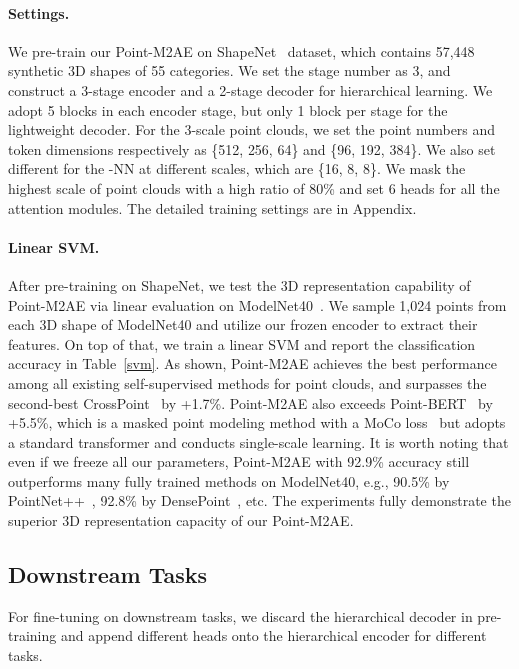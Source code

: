 \documentclass{article}
\begin{document}
\paragraph{Settings.}
We pre-train our Point-M2AE on ShapeNet~\cite{chang2015shapenet} dataset, which contains 57,448 synthetic 3D shapes of 55 categories. 
We set the stage number  as 3, and construct a 3-stage encoder and a 2-stage decoder for hierarchical learning. We adopt 5 blocks in each encoder stage, but only 1 block per stage for the lightweight decoder. For the 3-scale point clouds, we set the point numbers and token dimensions respectively as \{512, 256, 64\} and \{96, 192, 384\}. We also set different  for the -NN at different scales, which are \{16, 8, 8\}. We mask the highest scale of point clouds with a high ratio of 80\% and set 6 heads for all the attention modules. The detailed training settings are in Appendix.


\vspace{-0.1cm}
\paragraph{Linear SVM.}
After pre-training on ShapeNet, we test the 3D representation capability of Point-M2AE via linear evaluation on ModelNet40~\cite{modelnet40}. We sample 1,024 points from each 3D shape of ModelNet40 and utilize our frozen encoder to extract their features. On top of that, we train a linear SVM and report the classification accuracy in Table~\ref{svm}. As shown, Point-M2AE achieves the best performance among all existing self-supervised methods for point clouds, and surpasses the second-best CrossPoint~\cite{afham2022crosspoint} by +1.7\%. Point-M2AE also exceeds Point-BERT~\cite{pointbert} by +5.5\%, which is a masked point modeling method with a MoCo loss~\cite{he2020momentum} but adopts a standard transformer and conducts single-scale learning. It is worth noting that even if we freeze all our parameters, Point-M2AE with 92.9\% accuracy still outperforms many fully trained methods on ModelNet40, e.g., 90.5\% by PointNet++~\cite{qi2017pointnet++}, 92.8\% by DensePoint~\cite{densepoint}, etc. The experiments fully demonstrate the superior 3D representation capacity of our Point-M2AE. 


\subsection{Downstream Tasks}
\label{downstream}
For fine-tuning on downstream tasks, we discard the hierarchical decoder in pre-training and append different heads onto the hierarchical encoder for different tasks.
\end{document}
